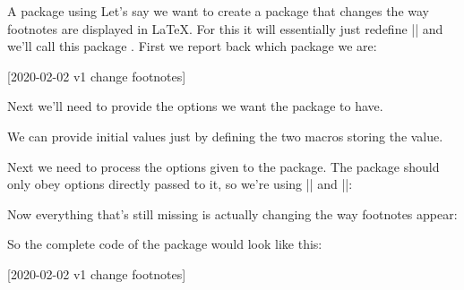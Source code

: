\begin{example}{A package using \expkvo}
  Let's say we want to create a package that changes the way footnotes are
  displayed in \LaTeX. For this it will essentially just redefine |\thefootnote|
  and we'll call this package . First we report back which
  package we are:
  \begin{enverb}[no-tcb]
    [2020-02-02 v1 change footnotes]
  \end{enverb}
  Next we'll need to provide the options we want the package to have.
  \begin{enverb}[no-tcb]
    \RequirePackage{color}
    \RequirePackage{expkv-opt}%
  \end{enverb}
  We can provide initial values just by defining the two macros storing the
  value.
  \begin{enverb}[no-tcb]
    \newcommand*\exfn@color{}
    \newcommand*\exfn@format{arabic}
  \end{enverb}
  Next we need to process the options given to the package. The package should
  only obey options directly passed to it, so we're using
  |\ekvoProcessLocalOptions| and |\ekvoProcessFutureOptions|:
  \begin{enverb}[no-tcb]
  \end{enverb}
  Now everything that's still missing is actually changing the way footnotes
  appear:
  \begin{enverb}[no-tcb]
    \renewcommand*\thefootnote
      {%
        \ifx\exfn@color\@empty
          \csname\exfn@format\endcsname{footnote}%
        \else
          \textcolor{\exfn@color}{\csname\exfn@format\endcsname{footnote}}%
        \fi
      }
  \end{enverb}
  So the complete code of the package would look like this:
  \begin{enverb}[no-tcb]
    [2020-02-02 v1 change footnotes]

    \RequirePackage{color}
    \RequirePackage{expkv-opt}%

    \newcommand*\exfn@color{}
    \newcommand*\exfn@format{arabic}



\end{enverb}
\end{example}
